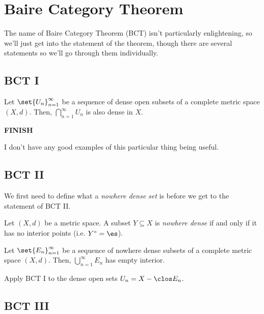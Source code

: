 \documentclass[class=article, crop=false]{standalone}
\begin{document}
\section{Baire Category Theorem}

The name of Baire Category Theorem (BCT) isn't particularly enlightening, so we'll just get into the statement of the theorem, though there are several statements so we'll go through them individually.

\subsection{BCT I}

\begin{thm}[BCT I]
    Let $\set{U_n}_{n=1}^\infty$ be a sequence of dense open subsets of a complete metric space $(X,d)$. Then, $\bigcap_{n=1}^{\infty} U_n$ is also dense in $X$.
\end{thm}
\begin{pf}
    \textbf{FINISH}
\end{pf}

I don't have any good examples of this particular thing being useful.

\subsection{BCT II}

We first need to define what a \textit{nowhere dense set} is before we get to the statement of BCT II.

\begin{defn}
    Let $(X,d)$ be a metric space. A subset $Y \subseteq X$ is \textit{nowhere dense} if and only if it has no interior points (i.e. $Y^\circ = \es$).
\end{defn}

\begin{thm}[BCT II]
    Let $\set{E_n}_{n=1}^\infty$ be a sequence of nowhere dense subsets of a complete metric space $(X,d)$. Then, $\bigcup_{n=1}^{\infty} E_n$ has empty interior.
\end{thm}
\begin{pf}
    Apply BCT I to the dense open sets $U_n = X - \clos E_n$.
\end{pf}


\subsection{BCT III}
\end{document}
